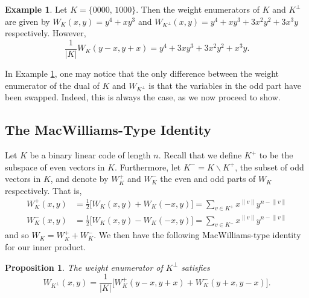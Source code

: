 \documentclass[a4paper,reqno]{amsart}
\newtheorem{proposition}[theorem]{Proposition}
\theoremstyle{definition}
\newtheorem{example}[theorem]{Example}
\theoremstyle{remark} \newtheorem{remark}[theorem]{Remark}
\numberwithin{equation}{section}
\begin{document}
\begin{example}\label{MWFails}
    Let \(K = \{0000,\, 1000\}\). Then the weight enumerators of \(K\) and \(K^\perp\) are given by \(W_K(x,y) = y^4 + xy^3\) and \(W_{K^\perp}(x,y) = y^4 + xy^3 + 3x^2y^2 + 3x^3y\) respectively. However,
    \begin{equation*}
        \frac{1}{\lvert K \rvert} W_K(y-x, y+x) = y^4 + 3xy^3 + 3x^2y^2 + x^3y.  
    \end{equation*}
\end{example}

In Example \ref{MWFails}, one may notice that the only difference between the weight enumerator of the dual of \(K\) and \(W_{K^\perp}\) is that the variables in the odd part have been swapped. Indeed, this is always the case, as we now proceed to show.

\subsection{The MacWilliams-Type Identity} Let \(K\) be a binary linear code of length \(n\). Recall that we define \(K^+\) to be the subspace of even vectors in \(K\). Furthermore, let \(K^- = K \smallsetminus K^+\), the subset of odd vectors in \(K\), and denote by \(W_K^+\) and \(W_K^-\) the even and odd parts of \(W_K\) respectively. That is,
\begin{align*}
    W_K^+(x,y) &= \frac{1}{2}\bigl[W_K(x, y) + W_K(-x,y)\bigr] = \sum_{v \in K^+}x^{\lVert v \rVert}y^{n - \lVert v \rVert} \\
    W_K^-(x,y) &= \frac{1}{2}\bigl[W_K(x, y) - W_K(-x,y)\bigr] = \sum_{v \in K^-}x^{\lVert v \rVert}y^{n - \lVert v \rVert}
\end{align*}
and so \(W_K = W_K^+ + W_K^-\). We then have the following MacWilliams-type identity for our inner product.

\begin{proposition}\label{MW-type}
    The weight enumerator of \(K^\perp\) satisfies
    \begin{equation*}
        W_{K^\perp}(x,y) = \frac{1}{\lvert K\rvert}\bigl[W_K^+(y-x, y+x) + W_K^-(y+x,y-x)\bigr].
    \end{equation*}
\end{proposition}
\end{document}

